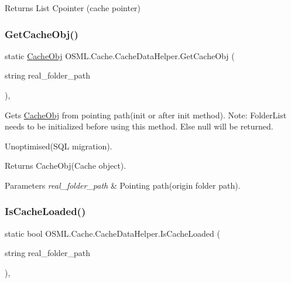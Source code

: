 \begin{DoxyReturn}{Returns}
List Cpointer (cache pointer) 
\end{DoxyReturn}
\mbox{\label{classOSML_1_1Cache_1_1CacheDataHelper_a3307f454b4daa9701f76200c5e082a88}} 
\subsubsection{\texorpdfstring{GetCacheObj()}{GetCacheObj()}}
{\footnotesize\ttfamily static \mbox{\hyperlink{classOSML_1_1Cache_1_1CacheObj}{Cache\+Obj}} O\+S\+M\+L.\+Cache.\+Cache\+Data\+Helper.\+Get\+Cache\+Obj (\begin{DoxyParamCaption}\item[{string}]{real\+\_\+folder\+\_\+path }\end{DoxyParamCaption})\hspace{0.3cm}{\ttfamily [inline]}, {\ttfamily [static]}}



Gets \mbox{\hyperlink{classOSML_1_1Cache_1_1CacheObj}{Cache\+Obj}} from pointing path(init or after init method). Note\+: Folder\+List needs to be initialized before using this method. Else null will be returned. 

Unoptimised(\+S\+Q\+L migration). 

\begin{DoxyReturn}{Returns}
Cache\+Obj(\+Cache object). 
\end{DoxyReturn}

\begin{DoxyParams}{Parameters}
{\em real\+\_\+folder\+\_\+path} & Pointing path(origin folder path).\\
\hline
\end{DoxyParams}
\mbox{\label{classOSML_1_1Cache_1_1CacheDataHelper_a27914b5a767dc440dfd4ccf8b68965f9}} 
\subsubsection{\texorpdfstring{IsCacheLoaded()}{IsCacheLoaded()}}
{\footnotesize\ttfamily static bool O\+S\+M\+L.\+Cache.\+Cache\+Data\+Helper.\+Is\+Cache\+Loaded (\begin{DoxyParamCaption}\item[{string}]{real\+\_\+folder\+\_\+path }\end{DoxyParamCaption})\hspace{0.3cm}{\ttfamily [inline]}, {\ttfamily [static]}}



